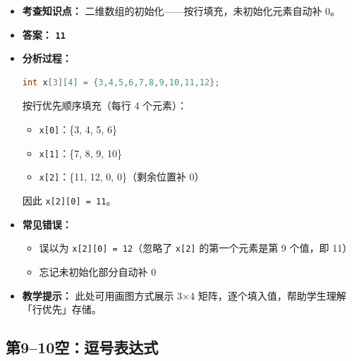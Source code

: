 \begin{itemize}
    \item \textbf{考查知识点：} 二维数组的初始化——按行填充，未初始化元素自动补 0。
    \item \textbf{答案：} \texttt{\textbf{11}}
    \item \textbf{分析过程：}
\begin{lstlisting}[language=C]
int x[3][4] = {3,4,5,6,7,8,9,10,11,12};
\end{lstlisting}
    按行优先顺序填充（每行 4 个元素）：
    \begin{itemize}
        \item \texttt{x[0]}：\{3, 4, 5, 6\}
        \item \texttt{x[1]}：\{7, 8, 9, 10\}
        \item \texttt{x[2]}：\{11, 12, 0, 0\}（剩余位置补 0）
    \end{itemize}
    因此 \texttt{x[2][0] = 11}。
    \item \textbf{常见错误：}
    \begin{itemize}
        \item 误以为 \texttt{x[2][0] = 12}（忽略了 \texttt{x[2]} 的第一个元素是第 9 个值，即 11）
        \item 忘记未初始化部分自动补 0
    \end{itemize}
    \item \textbf{教学提示：} 此处可用画图方式展示 3×4 矩阵，逐个填入值，帮助学生理解「行优先」存储。
\end{itemize}

\subsection{第9--10空：逗号表达式}


